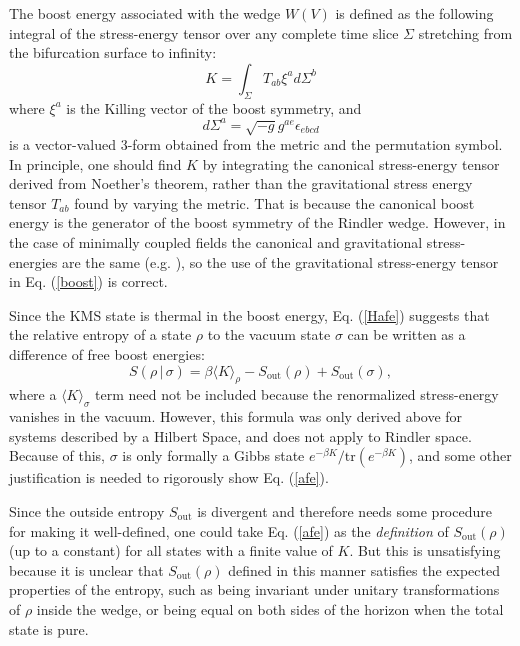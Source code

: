 \documentclass{article}
\begin{document}
The boost energy associated with the wedge $W(V)$ is defined as the following integral of the stress-energy tensor over any complete time slice $\Sigma$ stretching from the bifurcation surface to infinity:
\begin{equation}\label{boost}
K = \int_\Sigma T_{ab} \xi^a d\Sigma^b
\end{equation}
where $\xi^a$ is the Killing vector of the boost symmetry, and 
\begin{equation}
d\Sigma^a = \sqrt{-g} g^{ae} \epsilon_{ebcd}
\end{equation}
is a vector-valued 3-form obtained from the metric and the permutation symbol.  In principle, one should find $K$ by integrating the canonical stress-energy tensor derived from Noether's theorem, rather than the gravitational stress energy tensor $T_{ab}$ found by varying the metric.  That is because the canonical boost energy is the generator of the boost symmetry of the Rindler wedge.  However, in the case of minimally coupled fields the canonical and gravitational stress-energies are the same (e.g. \cite{fursaev99}), so the use of the gravitational stress-energy tensor in Eq. (\ref{boost}) is correct.

Since the KMS state is thermal in the boost energy, Eq. (\ref{Hafe}) suggests that the relative entropy of a state $\rho$ to the vacuum state $\sigma$ can be written as a difference of free boost energies:
\begin{equation}\label{afe}
S(\rho\,|\,\sigma) = \beta \langle K \rangle_\rho - S_\mathrm{out}(\rho) + S_\mathrm{out}(\sigma),
\end{equation}
where a $\langle K \rangle_{\sigma}$ term need not be included because the renormalized stress-energy vanishes in the vacuum.  However, this formula was only derived above for systems  described by a Hilbert Space, and does not apply to Rindler space.  Because of this, $\sigma$ is only formally a Gibbs state $e^{-\beta K}/\mathrm{tr}(e^{-\beta K})$, and some other justification is needed to rigorously show Eq. (\ref{afe}).

Since the outside entropy $S_\mathrm{out}$ is divergent and therefore needs some procedure for making it well-defined, one could take Eq. (\ref{afe}) as the \emph{definition} of $S_\mathrm{out}(\rho)$ (up to a constant) for all states with a finite value of $K$.  But this is unsatisfying because it is unclear that $S_\mathrm{out}(\rho)$ defined in this manner satisfies the expected properties of the entropy, such as being invariant under unitary transformations of $\rho$ inside the wedge, or being equal on both sides of the horizon when the total state is pure.
\end{document}
